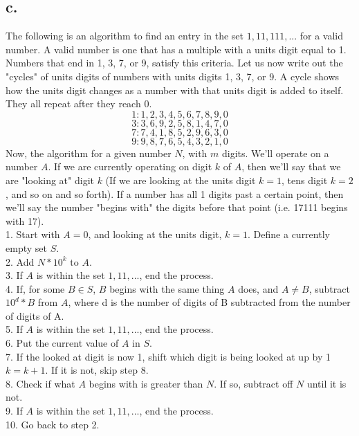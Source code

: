 \documentclass{article}
\begin{document}
\subsection*{c.}
The following is an algorithm to find an entry in the set ${1, 11, 111, ...}$ for a valid number. A valid number is one that has a multiple with a units digit equal to 1. Numbers that end in 1, 3, 7, or 9, satisfy this criteria. Let us now write out the "cycles" of units digits of numbers with units digits 1, 3, 7, or 9. A cycle shows how the units digit changes as a number with that units digit is added to itself. They all repeat after they reach 0.
$$1: 1, 2, 3, 4, 5, 6, 7, 8, 9, 0$$
$$3: 3, 6, 9, 2, 5, 8, 1, 4, 7, 0$$
$$7: 7, 4, 1, 8, 5, 2, 9, 6, 3, 0$$
$$9: 9, 8, 7, 6, 5, 4, 3, 2, 1, 0$$
Now, the algorithm for a given number $N$, with $m$ digits. We'll operate on a number $A$. If we are currently operating on digit $k$ of $A$, then we'll say that we are "looking at" digit $k$ (If we are looking at the units digit $k=1$, tens digit $k=2$, and so on and so forth). If a number has all 1 digits past a certain point, then we'll say the number "begins with" the digits before that point (i.e. 17111 begins with 17).
\\1. Start with $A=0$, and looking at the units digit, $k=1$. Define a currently empty set $S$.
\\2. Add $N*10^k$ to $A$.
\\3. If $A$ is within the set ${1, 11, ...}$, end the process.
\\4. If, for some $B \in S$, $B$ begins with the same thing $A$ does, and $A \neq B$, subtract $10^d * B$ from $A$, where d is the number of digits of B subtracted from the number of digits of A.
\\5. If $A$ is within the set ${1, 11, ...}$, end the process.
\\6. Put the current value of $A$ in $S$.
\\7. If the looked at digit is now 1, shift which digit is being looked at up by 1 $k=k+1$. If it is not, skip step 8.
\\8. Check if what $A$ begins with is greater than $N$. If so, subtract off $N$ until it is not. 
\\9. If $A$ is within the set ${1, 11, ...}$, end the process.
\\10. Go back to step 2.
\end{document}
